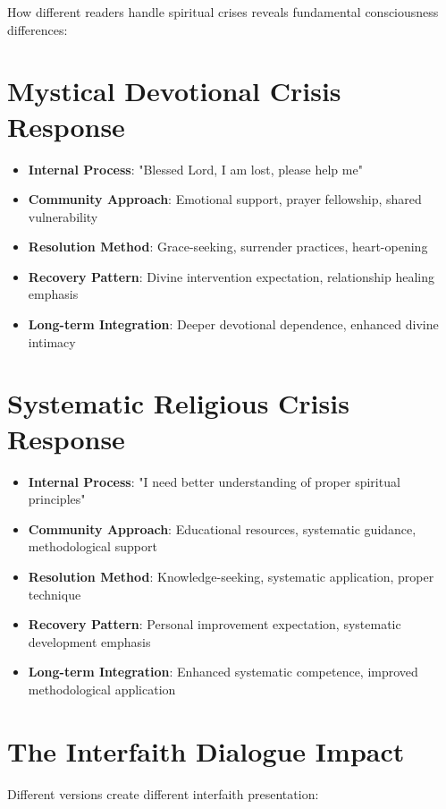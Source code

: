 \documentclass[11pt,twoside]{book}
\begin{document}
How different readers handle spiritual crises reveals fundamental consciousness differences:
\section*{Mystical Devotional Crisis Response}
\label{sec:orgaa397c9}
\begin{itemize}
\item \textbf{\textbf{Internal Process}}: "Blessed Lord, I am lost, please help me"
\item \textbf{\textbf{Community Approach}}: Emotional support, prayer fellowship, shared vulnerability
\item \textbf{\textbf{Resolution Method}}: Grace-seeking, surrender practices, heart-opening
\item \textbf{\textbf{Recovery Pattern}}: Divine intervention expectation, relationship healing emphasis
\item \textbf{\textbf{Long-term Integration}}: Deeper devotional dependence, enhanced divine intimacy
\end{itemize}
\section*{Systematic Religious Crisis Response}
\label{sec:org03abef0}
\begin{itemize}
\item \textbf{\textbf{Internal Process}}: "I need better understanding of proper spiritual principles"
\item \textbf{\textbf{Community Approach}}: Educational resources, systematic guidance, methodological support
\item \textbf{\textbf{Resolution Method}}: Knowledge-seeking, systematic application, proper technique
\item \textbf{\textbf{Recovery Pattern}}: Personal improvement expectation, systematic development emphasis
\item \textbf{\textbf{Long-term Integration}}: Enhanced systematic competence, improved methodological application
\end{itemize}
\section*{The Interfaith Dialogue Impact}
\label{sec:org269ac5e}

Different versions create different interfaith presentation:
\end{document}
